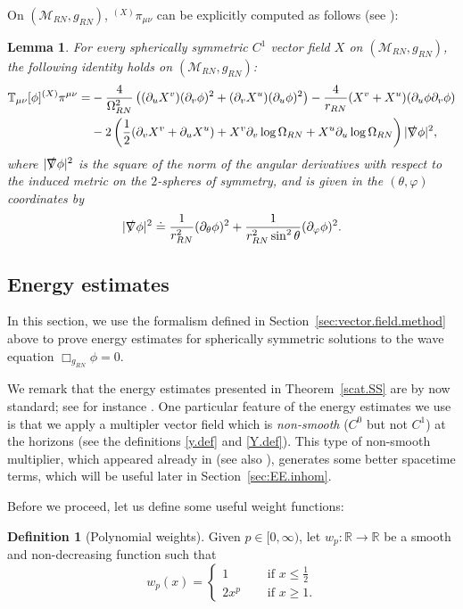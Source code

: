 \documentclass[10pt, reqno]{amsart}
\newtheorem{lemma}[theorem]{Lemma}
\theoremstyle{definition}
\newtheorem{definition}[theorem]{Definition}
\theoremstyle{remark}
\numberwithin{equation}{section}
\newcommand{\rd}{\partial}
\newcommand{\0}{\emptyset}
\newcommand{\Omg}{\Omega}
\newcommand{\f}{\frac}
\begin{document}
On $(\mathcal M_{RN},g_{RN})$, ${ }^{(X)}\pi_{\mu\nu}$ can be explicitly computed as follows (see \cite{Fra}):
\begin{lemma}\label{RN.K}
For every spherically symmetric $C^1$ vector field $X$ on $(\mathcal M_{RN},g_{RN})$, the following identity holds on $(\mathcal M_{RN},g_{RN})$:
\begin{equation*}
\begin{split}
\mathbb T_{\mu\nu}[\phi]{ }^{(X)}\pi^{\mu\nu}=&-\f{4}{\Omg_{RN}^2}\left((\rd_uX^v)(\rd_v\phi)^2+(\rd_vX^u)(\rd_u\phi)^2\right)-\f {4}{r_{RN}} (X^v+X^u)(\rd_u\phi\rd_v\phi)\\
&- 2\left(\f 12(\rd_vX^v+\rd_uX^u)+X^v \rd_v\log\Omg_{RN} + X^u \rd_u\log\Omg_{RN} \right)|\slashed\nabla\phi|^2,
\end{split}
\end{equation*}
where $|\slashed\nabla\phi|^2$ is the square of the norm of the angular derivatives with respect to the induced metric on the $2$-spheres of symmetry, and is given in the $(\theta,\varphi)$ coordinates by
$$|\slashed\nabla\phi|^2 \doteq \f{1}{r_{RN}^2}(\rd_\theta\phi)^2 + \f{1}{r_{RN}^2\sin^2\theta}(\rd_\varphi\phi)^2.$$
\end{lemma}


\subsection{Energy estimates}\label{sec:SS.EE}

In this section, we use the formalism defined in Section~\ref{sec:vector.field.method} above to prove energy estimates for spherically symmetric solutions to the wave equation $\Box_{g_{RN}} \phi = 0$.

We remark that the energy estimates presented in Theorem~\ref{scat.SS} are by now standard; see for instance \cite{Fra, KSR}. One particular feature of the energy estimates we use is that we apply a multipler vector field which is \emph{non-smooth} ($C^0$ but not $C^1$) at the horizons (see the definitions \eqref{y.def} and \eqref{Y.def}). This type of non-smooth multiplier, which appeared already in \cite[Proposition~9.2]{LO.interior} (see also \cite{DRS}), generates some better spacetime terms, which will be useful later in Section~\ref{sec:EE.inhom}.

Before we proceed, let us define some useful weight functions:
\begin{definition}[Polynomial weights]\label{def:w.weight}
Given $p \in [0,\infty)$, let $w_p:\mathbb R\to \mathbb R$ be a smooth and non-decreasing function such that
$$w_p(x)=\begin{cases}
1 \quad &\mbox{ if }x \leq \f 12\\
2 x^{p} \quad &\mbox{ if }x\geq 1.
\end{cases}
$$


\end{definition}
\end{document}
